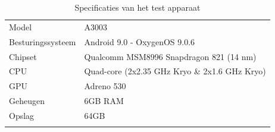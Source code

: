 \begin{table}[H]
    \centering
    \begin{tabular}{ll}
        Model & A3003 \\
        Besturingssysteem & Android 9.0 - OxygenOS 9.0.6 \\
        Chipset & Qualcomm MSM8996 Snapdragon 821 (14 nm)  \\
        CPU & Quad-core (2x2.35 GHz Kryo \& 2x1.6 GHz Kryo) \\
        GPU &  Adreno 530 \\
        Geheugen & 6GB RAM \\
        Opslag & 64GB \\ 
        &
    \end{tabular}
    \caption{Specificaties van het test apparaat}
    \label{table:specifications-test-device}
\end{table}


